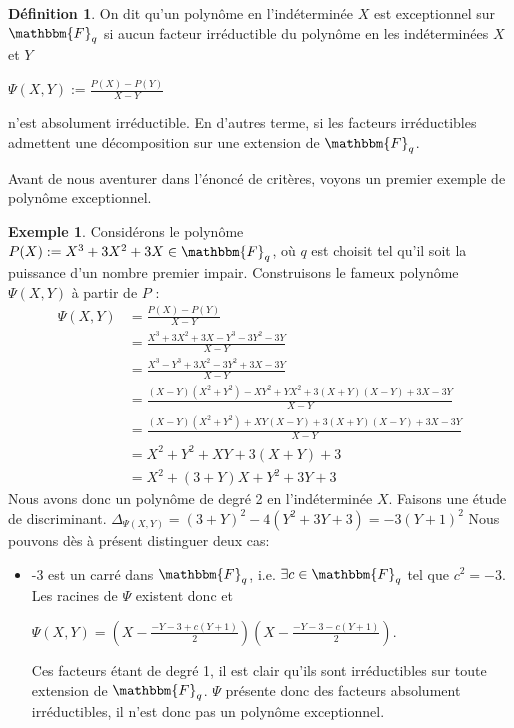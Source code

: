 \documentclass[12pt]{article}
\newcommand{\Fq}{\mathbbm{F}_q}
\theoremstyle{definition}
\newtheorem{definition}{Définition}
\newtheorem{example}{Exemple}
\begin{document}
\begin{definition}
On dit qu'un polynôme en l'indéterminée $X$ est exceptionnel sur $\Fq$ si aucun facteur irréductible du polynôme en les indéterminées $X$ et $Y$
\begin{center}
$\Psi (X,Y) := \displaystyle\frac{P(X) - P(Y)}{X-Y}$
\end{center}
n'est absolument irréductible. En d'autres terme, si les facteurs irréductibles admettent une décomposition sur une extension de $\Fq$.
\end{definition}

Avant de nous aventurer dans l'énoncé de critères, voyons un premier exemple de polynôme exceptionnel.

\begin{example}
Considérons le polynôme $P(X) := X^3 +3X^2 + 3X \in \Fq$, où $q$ est choisit tel qu'il soit la puissance d'un nombre premier impair. \newline
Construisons le fameux polynôme $\Psi(X,Y)$ à partir de $P$ :
	\begin{align*}
\Psi(X,Y) &= \displaystyle\frac{P(X) - P(Y)}{X-Y} \\
&= \displaystyle\frac{X^3 + 3X^2 + 3X - Y^3 - 3Y^2 - 3Y}{X -Y} \\
&= \displaystyle\frac{X^3 - Y^3 + 3X^2 - 3Y^2 + 3X - 3Y}{X -Y} \\
&= \displaystyle\frac{(X-Y)(X^2+Y^2) - XY^2 + YX^2 + 3(X+Y)(X-Y) +3X - 3Y}{X -Y} \\
&= \displaystyle\frac{(X-Y)(X^2+Y^2) + XY(X-Y) + 3(X+Y)(X-Y) +3X - 3Y}{X -Y} \\
&= \displaystyle X^2+Y^2 +XY+ 3(X+Y) +3\\
&= X^2 + (3+Y)X + Y^2 + 3Y + 3
	\end{align*}
Nous avons donc un polynôme de degré 2 en l'indéterminée $X$. Faisons une étude de discriminant. \newline
$\Delta_{\Psi(X,Y)} = (3+Y)^2 - 4(Y^2 + 3Y + 3) = -3(Y+1)^2$ \newline 
Nous pouvons dès à présent distinguer deux cas: 
	\begin{itemize}
		\item -3 est un carré dans $\Fq$, i.e. $\exists c\in \Fq$ tel que $c^2 = -3$. Les racines de $\Psi$ existent donc et 
			\begin{center} $\Psi(X,Y) = (\displaystyle X - \frac{-Y -3 + c(Y+1)}{2})( X - \frac{-Y -3 - c(Y+1)}{2})$.\end{center}
Ces facteurs étant de degré 1, il est clair qu'ils sont irréductibles sur toute extension de $\Fq$. $\Psi$ présente donc des facteurs absolument irréductibles, il n'est donc pas un polynôme exceptionnel.

\end{itemize}
\end{example}
\end{document}
